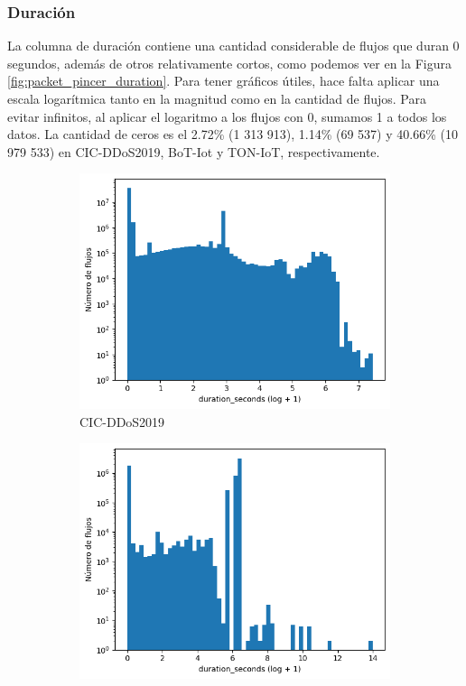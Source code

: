 \subsubsection{Duración}

La columna de duración contiene una cantidad considerable de flujos que duran 0 segundos, además de otros relativamente cortos, como podemos ver en la Figura \ref{fig:packet_pincer_duration}. Para tener gráficos útiles, hace falta aplicar una escala logarítmica tanto en la magnitud como en la cantidad de flujos. Para evitar infinitos, al aplicar el logaritmo a los flujos con 0, sumamos 1 a todos los datos. La cantidad de ceros es el 2.72\% (1 313 913), 1.14\% (69 537) y 40.66\% (10 979 533) en CIC-DDoS2019, BoT-Iot y TON-IoT, respectivamente.

\begin{figure}[H]
    \centering
    \begin{subfigure}[b]{0.26\textwidth}
        \centering
        \includegraphics[width=\textwidth]{media/packet_pincer_cicddos/duration_seconds_log_x_log_y.png}
        \caption{CIC-DDoS2019}
    \end{subfigure}
    \hfill
    \begin{subfigure}[b]{0.26\textwidth}
        \centering
        \includegraphics[width=\linewidth]{media/packet_pincer_botiot/duration_seconds_log_x_log_y.png}

\end{subfigure}
\end{figure}
